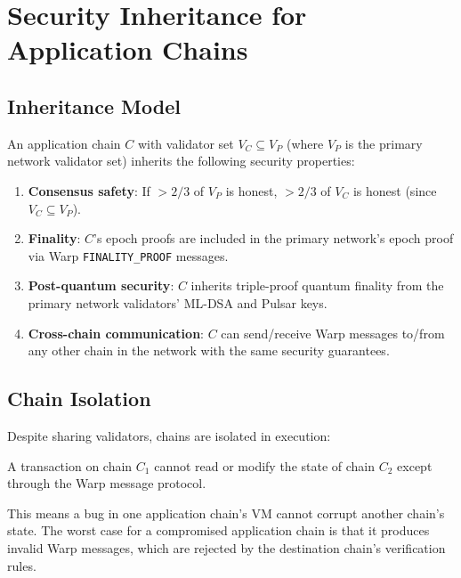 \section{Security Inheritance for Application Chains}


\subsection{Inheritance Model}

An application chain $C$ with validator set $V_C \subseteq V_P$ (where $V_P$ is the primary network validator set) inherits the following security properties:

\begin{enumerate}[leftmargin=2em]
\item \textbf{Consensus safety}: If $>2/3$ of $V_P$ is honest, $>2/3$ of $V_C$ is honest (since $V_C \subseteq V_P$).
\item \textbf{Finality}: $C$'s epoch proofs are included in the primary network's epoch proof via Warp \texttt{FINALITY\_PROOF} messages.
\item \textbf{Post-quantum security}: $C$ inherits triple-proof quantum finality from the primary network validators' ML-DSA and Pulsar keys.
\item \textbf{Cross-chain communication}: $C$ can send/receive Warp messages to/from any other chain in the network with the same security guarantees.
\end{enumerate}

\subsection{Chain Isolation}

Despite sharing validators, chains are isolated in execution:

\begin{invariant}
A transaction on chain $C_1$ cannot read or modify the state of chain $C_2$ except through the Warp message protocol.
\end{invariant}

This means a bug in one application chain's VM cannot corrupt another chain's state. The worst case for a compromised application chain is that it produces invalid Warp messages, which are rejected by the destination chain's verification rules.


